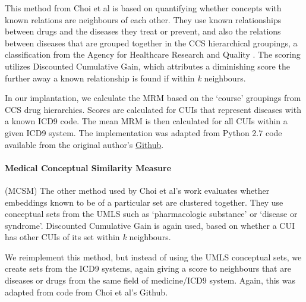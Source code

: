 \documentclass[11pt,a4paper]{article}
\begin{document}
This method from Choi et al  is based on quantifying whether concepts with known relations are neighbours of each other.  They use known relationships between drugs and the diseases they treat or prevent, and also the relations between diseases that are grouped together in the CCS hierarchical groupings, a classification from the Agency for Healthcare Research and Quality \cite{ClinicalClassificationsSoftware}. The scoring utilizes Discounted Cumulative Gain, which attributes a diminishing score the further away a known relationship is found if within \emph{k} neighbours. 

In our implantation, we calculate the MRM based on the `course' groupings from CCS drug hierarchies. Scores are calculated for CUIs that represent diseases with a known ICD9 code. The mean MRM is then calculated for all CUIs within a given ICD9 system. The implementation was adapted from Python 2.7 code available from the original author's \href{https://github.com/clinicalml/embeddings}{Github}.


\paragraph{Medical Conceptual Similarity Measure}(MCSM) The other method used by Choi et al's work evaluates whether embeddings known to be of a particular set are clustered together. They use conceptual sets from the UMLS such as `pharmacologic substance' or `disease or syndrome'.  Discounted Cumulative Gain is again used, based on whether a CUI has other CUIs of its set within \emph{k} neighbours. 

We reimplement this method, but instead of using the UMLS conceptual sets, we create sets from the ICD9 systems, again giving a score to neighbours that are diseases or drugs from the same field of medicine/ICD9 system. Again, this was adapted from code from Choi et al's Github.  

%
\end{document}
